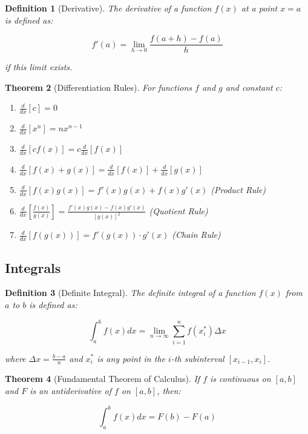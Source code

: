 \documentclass[12pt]{article}
\newif\ifDarkMode
\newcommand{\eqcolor}[1]{\ifDarkMode\textcolor{draculaPurple}{#1}\else#1\fi}
\newcommand{\varcolor}[1]{\ifDarkMode\textcolor{draculaGreen}{#1}\else#1\fi}
\newtheorem{theorem}{Theorem}[section]
\newtheorem{definition}[theorem]{Definition}
\begin{document}
\begin{definition}[Derivative]
The derivative of a function $\varcolor{f(x)}$ at a point $\varcolor{x = a}$ is defined as:

\[
\eqcolor{f'(a) = \lim_{h \to 0} \frac{f(a + h) - f(a)}{h}}
\]

if this limit exists.
\end{definition}

\begin{theorem}[Differentiation Rules]
For functions $\varcolor{f}$ and $\varcolor{g}$ and constant $\varcolor{c}$:
\begin{enumerate}
    \item $\eqcolor{\frac{d}{dx}[c] = 0}$
    \item $\eqcolor{\frac{d}{dx}[x^n] = nx^{n-1}}$
    \item $\eqcolor{\frac{d}{dx}[cf(x)] = c\frac{d}{dx}[f(x)]}$
    \item $\eqcolor{\frac{d}{dx}[f(x) + g(x)] = \frac{d}{dx}[f(x)] + \frac{d}{dx}[g(x)]}$
    \item $\eqcolor{\frac{d}{dx}[f(x)g(x)] = f'(x)g(x) + f(x)g'(x)}$ (Product Rule)
    \item $\eqcolor{\frac{d}{dx}\left[\frac{f(x)}{g(x)}\right] = \frac{f'(x)g(x) - f(x)g'(x)}{[g(x)]^2}}$ (Quotient Rule)
    \item $\eqcolor{\frac{d}{dx}[f(g(x))] = f'(g(x)) \cdot g'(x)}$ (Chain Rule)
\end{enumerate}
\end{theorem}

\subsection{\textcolor{draculaYellow}{Integrals}}

\begin{definition}[Definite Integral]
The definite integral of a function $\varcolor{f(x)}$ from $\varcolor{a}$ to $\varcolor{b}$ is defined as:

\[
\eqcolor{\int_a^b f(x) dx = \lim_{n \to \infty} \sum_{i=1}^n f(x_i^*) \Delta x}
\]

where $\varcolor{\Delta x = \frac{b-a}{n}}$ and $\varcolor{x_i^*}$ is any point in the $\varcolor{i}$-th subinterval $\varcolor{[x_{i-1}, x_i]}$.
\end{definition}

\begin{theorem}[Fundamental Theorem of Calculus]
If $\varcolor{f}$ is continuous on $\varcolor{[a, b]}$ and $\varcolor{F}$ is an antiderivative of $\varcolor{f}$ on $\varcolor{[a, b]}$, then:

\[
\eqcolor{\int_a^b f(x) dx = F(b) - F(a)}
\]
\end{theorem}
\end{document}
